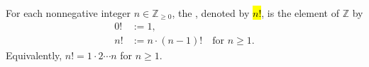 \begin{definition} \label{definition:factorial_of_a_nonnegative_integer}
    For each nonnegative integer $n \in \mathbb{Z}_{\geq 0}$, the , denoted by \hl{$n!$}, is the element of $\mathbb{Z}$  by
    \begin{align*}
        0! &:= 1, \\
        n! &:= n \cdot (n-1)! \quad\text{for } n \geq 1.
    \end{align*}
    Equivalently, $n! = 1 \cdot 2 \cdots n$ for $n \geq 1$.
\end{definition}

